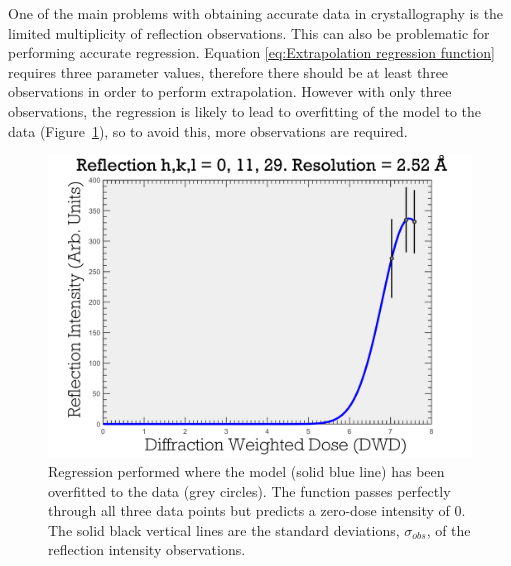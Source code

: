 One of the main problems with obtaining accurate data in crystallography is the limited multiplicity of reflection observations.
This can also be problematic for performing accurate regression.
Equation \ref{eq:Extrapolation regression function} requires three parameter values, therefore there should be at least three observations in order to perform extrapolation.
However with only three observations, the regression is likely to lead to overfitting of the model to the data (Figure~\ref{fig:Data Overfitting to few data points - Extrapolation method}), so to avoid this, more observations are required.
\begin{figure}
  \centering
    \includegraphics[width=1\textwidth]{figures/zde/ReflectionPlot_h,k,l_0,11,29-3obs.pdf}
    \caption[Poor regression fit: overfitting.]{Regression performed where the model (solid blue line) has been overfitted to the data (grey circles).
    The function passes perfectly through all three data points but predicts a zero-dose intensity of 0.
    The solid black vertical lines are the standard deviations, $\sigma_{obs}$, of the reflection intensity observations.}
    \label{fig:Data Overfitting to few data points - Extrapolation method}
\end{figure}

